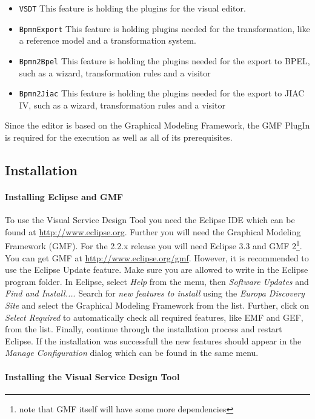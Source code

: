 \begin{itemize}
\item \texttt{VSDT} This feature is holding the plugins for the visual editor.
\item \texttt{BpmnExport} This feature is holding plugins needed for the transformation, like a reference model and a transformation system.
\item \texttt{Bpmn2Bpel} This feature is holding the plugins needed for the export to BPEL, such as a wizard, transformation rules and a visitor
\item \texttt{Bpmn2Jiac} This feature is holding the plugins needed for the export to JIAC IV, such as a wizard, transformation rules and a visitor
\end{itemize}

Since the editor is based on the Graphical Modeling Framework, the GMF PlugIn is required for the execution as well as all of its prerequisites.


\subsection{Installation}

\paragraph*{Installing Eclipse and GMF}

To use the Visual Service Design Tool you need the Eclipse IDE which can be found at \url{http://www.eclipse.org}. Further you will need the Graphical Modeling Framework (GMF). For the 2.2.x release you will need Eclipse 3.3 and GMF 2\footnote{note that GMF itself will have some more dependencies}. You can get GMF at \url{http://www.eclipse.org/gmf}. However, it is recommended to use the Eclipse Update feature. Make sure you are allowed to write in the Eclipse program folder. In Eclipse, select \emph{Help} from the menu, then \emph{Software Updates} and \emph{Find and Install...}. Search for \emph{new features to install} using the \emph{Europa Discovery Site} and select the Graphical Modeling Framework from the list. Further, click on \emph{Select Required} to automatically check all required features, like EMF and GEF, from the list. Finally, continue through the installation process and restart Eclipse. If the installation was successfull the new features should appear in the \emph{Manage Configuration} dialog which can be found in the same menu.

\paragraph*{Installing the Visual Service Design Tool}

